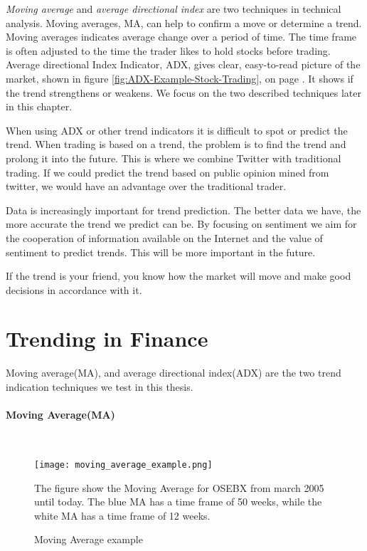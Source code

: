 \textit{Moving average} and \textit{average directional index} are two
techniques in technical analysis. Moving averages, MA, can help to confirm a
move or determine a trend. Moving averages indicates average change over a
period of time. The time frame is often adjusted to the time the trader likes to
hold stocks before trading. Average directional Index Indicator, ADX, gives
clear, easy-to-read picture of the market, shown in figure
\ref{fig:ADX-Example-Stock-Trading}, on page
\pageref{fig:ADX-Example-Stock-Trading}. It shows if the trend strengthens or
weakens. We focus on the two described techniques later in this chapter.

When using ADX or other trend indicators it is difficult to spot or predict the
trend. When trading is based on a trend, the problem is to find
the trend and prolong it into the future. This is where we combine Twitter
with traditional trading. If we could predict the trend based on public opinion
mined from twitter, we would have an advantage over the traditional trader. 

Data is increasingly important for trend prediction. The better data we have,
the more accurate the trend we predict can be. By focusing on sentiment we aim
for the cooperation of information available on the Internet and the value of
sentiment to predict trends. This will be more important in the future. 

If the trend is your friend, you know how the market will move and make
good decisions in accordance with it. 
%

\section{Trending in Finance}\label{trend:trends_in_finance}
Moving average(MA), and average directional index(ADX) are the two trend
indication techniques we test in this thesis. 

\paragraph{Moving Average(MA)}
\hspace{0pt}\\
\begin{figure}[htb]
    \centering
    \texttt{[image: moving\_average\_example.png]}
    \label{fig:moving_average_example}
    \caption{Moving Average example}
The figure show the Moving Average for OSEBX from march 2005 until today. The
blue MA has a time frame of 50 weeks, while the white MA has a time frame of 12
weeks. 
\end{figure}


